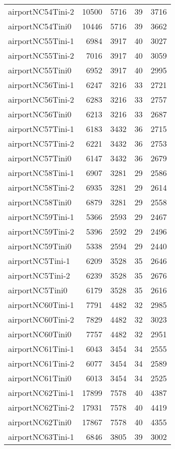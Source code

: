 \begin{longtable}{lrrrr}
airportNC54Tini-2 & 10500 & 5716 & 39 & 3716 \\
airportNC54Tini0 & 10446 & 5716 & 39 & 3662 \\
airportNC55Tini-1 & 6984 & 3917 & 40 & 3027 \\
airportNC55Tini-2 & 7016 & 3917 & 40 & 3059 \\
airportNC55Tini0 & 6952 & 3917 & 40 & 2995 \\
airportNC56Tini-1 & 6247 & 3216 & 33 & 2721 \\
airportNC56Tini-2 & 6283 & 3216 & 33 & 2757 \\
airportNC56Tini0 & 6213 & 3216 & 33 & 2687 \\
airportNC57Tini-1 & 6183 & 3432 & 36 & 2715 \\
airportNC57Tini-2 & 6221 & 3432 & 36 & 2753 \\
airportNC57Tini0 & 6147 & 3432 & 36 & 2679 \\
airportNC58Tini-1 & 6907 & 3281 & 29 & 2586 \\
airportNC58Tini-2 & 6935 & 3281 & 29 & 2614 \\
airportNC58Tini0 & 6879 & 3281 & 29 & 2558 \\
airportNC59Tini-1 & 5366 & 2593 & 29 & 2467 \\
airportNC59Tini-2 & 5396 & 2592 & 29 & 2496 \\
airportNC59Tini0 & 5338 & 2594 & 29 & 2440 \\
airportNC5Tini-1 & 6209 & 3528 & 35 & 2646 \\
airportNC5Tini-2 & 6239 & 3528 & 35 & 2676 \\
airportNC5Tini0 & 6179 & 3528 & 35 & 2616 \\
airportNC60Tini-1 & 7791 & 4482 & 32 & 2985 \\
airportNC60Tini-2 & 7829 & 4482 & 32 & 3023 \\
airportNC60Tini0 & 7757 & 4482 & 32 & 2951 \\
airportNC61Tini-1 & 6043 & 3454 & 34 & 2555 \\
airportNC61Tini-2 & 6077 & 3454 & 34 & 2589 \\
airportNC61Tini0 & 6013 & 3454 & 34 & 2525 \\
airportNC62Tini-1 & 17899 & 7578 & 40 & 4387 \\
airportNC62Tini-2 & 17931 & 7578 & 40 & 4419 \\
airportNC62Tini0 & 17867 & 7578 & 40 & 4355 \\
airportNC63Tini-1 & 6846 & 3805 & 39 & 3002 \\

\end{longtable}
